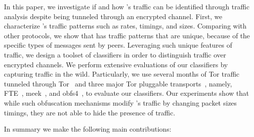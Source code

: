 In this paper, we investigate if and how  \bc's traffic can be identified through traffic analysis despite being tunneled through an encrypted channel. 
First, we characterize \bc's traffic patterns such as rates, timings, and sizes. 
Comparing with other protocols, we show that \bc has traffic patterns that are unique, because of the specific types of messages sent by \bc peers. 
Leveraging such unique features of \bc traffic, we design a toolset of classifiers in order to distinguish \bc traffic over encrypted channels. 
We perform extensive evaluations of our classifiers by capturing \bc traffic in the wild. Particularly, we use several months of Tor traffic tunneled through Tor~\cite{tor} and three major Tor pluggable transports~\cite{pluggable-transport}, namely, FTE~\cite{fte}, meek~\cite{meek}, and obfs4~\cite{obfsproxy}, to evaluate our classifiers. 
Our experiments show that while such obfuscation mechanisms modify \bc's traffic by changing packet sizes timings, they are not able to hide the presence of \bc traffic.
\begin{comment}
Our experiments show that while such obfuscation mechanisms modify \bc's traffic by changing the sizes of packets, and changing packet latencies, for each of the protocols we are able to design a reliable classifier to identify \bc traffic from other traffic. 
Our classifiers can even detect \bc traffic mixed with background traffic such as open browser tabs.

Based on our experiments, we conclude that standard obfuscation mechanisms do not do a good job in hiding Bitcoin traffic. 
This is due to a fundamental issue: Bitcoin (and all blockchain protocols we are aware of) generate of particular protocol messages with unique sizes and frequencies. To hide such unique patterns, an obfuscating protocol needs to apply significant cover traffic or apply large perturbations. 
The latter option has significant implications to the security of a cryptocurrency system.
\end{comment}

In summary we make the following main contributions:


